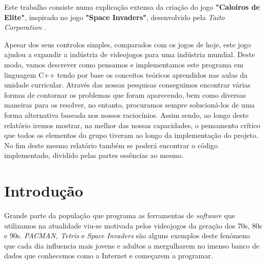\documentclass[a4paper,11pt]{article}
\newcommand\tab[1][0.8cm]{\hspace*{#1}}
\begin{document}
\tab Este trabalho consiste numa explicação extensa da criação do jogo \textbf{"Caloiros de Elite"}, inspirado no jogo \textbf{"Space Invaders"}, desenvolvido pela \textit{Taito Corporation} \cite{spaceInv}.  \par
\vspace{8pt}
Apesar dos seus controlos simples,
comparados com os jogos de hoje, este jogo ajudou a expandir a indústria de videojogos para
uma indústria mundial. Deste modo, vamos descrever como pensamos e implementamos este programa em linguagem C++ tendo por base os conceitos teóricos aprendidos nas aulas da unidade curricular.
Através das nossas pesquisas conseguimos encontrar várias formas de contornar os problemas que
foram aparecendo, bem como diversas maneiras para os resolver, no entanto, procuramos sempre
solucioná-los de uma forma alternativa baseada nos nossos raciocínios. Assim sendo, ao longo
deste relatório iremos mostrar, na melhor das nossas capacidades, o pensamento crítico que todos os elementos do grupo tiveram ao longo da implementação do projeto. No fim
deste mesmo relatório também se poderá encontrar o código implementado, dividido pelas partes
essências ao mesmo.

     
\vspace{8pt}

\vspace{40pt}


\pagebreak

\pagebreak


\renewcommand{\contentsname}{Índice}        %
\tableofcontents
{}

\vspace{40pt}
\listoffigures

\vspace{40pt}
\listoftables

\pagebreak


\setcounter{secnumdepth}{3}


\section{Introdução}\label{Intro}

\setcounter{page}{1}
\tab 

\vspace{8pt}

Grande parte da população que programa as ferramentas de \textit{software} que utilizamos na atualidade viu-se motivada pelos videojogos da geração dos 70s, 80s e 90s. \textit{PACMAN, Tetris} e \textit{Space Invaders} são alguns exemplos deste fenómeno que cada dia influencia mais jovens e adultos a mergulharem no imenso banco de dados que conhecemos como a Internet e começarem a programar.
\end{document}
